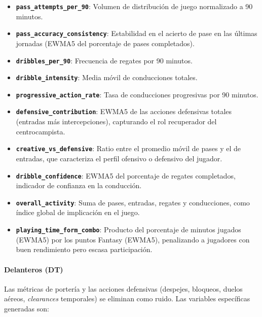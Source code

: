 \begin{itemize}
    \item \textbf{\texttt{pass\_attempts\_per\_90}}: Volumen de distribución de juego
    normalizado a 90 minutos.
    \item \textbf{\texttt{pass\_accuracy\_consistency}}: Estabilidad en el acierto de
    pase en las últimas jornadas (EWMA5 del porcentaje de pases completados).
    \item \textbf{\texttt{dribbles\_per\_90}}: Frecuencia de regates por 90 minutos.
    \item \textbf{\texttt{dribble\_intensity}}: Media móvil de conducciones totales.
    \item \textbf{\texttt{progressive\_action\_rate}}: Tasa de conducciones progresivas
    por 90 minutos.
    \item \textbf{\texttt{defensive\_contribution}}: EWMA5 de las acciones defensivas
    totales (entradas más intercepciones), capturando el rol recuperador del centrocampista.
    \item \textbf{\texttt{creative\_vs\_defensive}}: Ratio entre el promedio móvil de
    pases y el de entradas, que caracteriza el perfil ofensivo o defensivo del jugador.
    \item \textbf{\texttt{dribble\_confidence}}: EWMA5 del porcentaje de regates
    completados, indicador de confianza en la conducción.
    \item \textbf{\texttt{overall\_activity}}: Suma de pases, entradas, regates y
    conducciones, como índice global de implicación en el juego.
    \item \textbf{\texttt{playing\_time\_form\_combo}}: Producto del porcentaje de
    minutos jugados (EWMA5) por los puntos Fantasy (EWMA5), penalizando a jugadores
    con buen rendimiento pero escasa participación.
\end{itemize}
 
\paragraph{Delanteros (DT)}
 
Las métricas de portería y las acciones defensivas (despejes, bloqueos, duelos aéreos,
\textit{clearances} temporales) se eliminan como ruido. Las variables específicas
generadas son:
 
